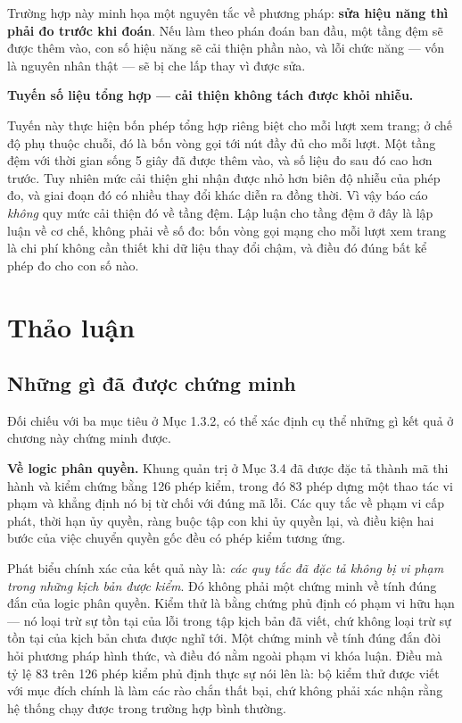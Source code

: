 Trường hợp này minh họa một nguyên tắc về phương pháp: \textbf{sửa hiệu năng thì phải đo trước khi đoán}. Nếu làm theo phán đoán ban đầu, một tầng đệm sẽ được thêm vào, con số hiệu năng sẽ cải thiện phần nào, và lỗi chức năng --- vốn là nguyên nhân thật --- sẽ bị che lấp thay vì được sửa.

\noindent \textbf{Tuyến số liệu tổng hợp --- cải thiện không tách được khỏi nhiễu.}

Tuyến này thực hiện bốn phép tổng hợp riêng biệt cho mỗi lượt xem trang; ở chế độ phụ thuộc chuỗi, đó là bốn vòng gọi tới nút đầy đủ cho mỗi lượt. Một tầng đệm với thời gian sống 5 giây đã được thêm vào, và số liệu đo sau đó cao hơn trước. Tuy nhiên mức cải thiện ghi nhận được nhỏ hơn biên độ nhiễu của phép đo, và giai đoạn đó có nhiều thay đổi khác diễn ra đồng thời. Vì vậy báo cáo \emph{không} quy mức cải thiện đó về tầng đệm. Lập luận cho tầng đệm ở đây là lập luận về cơ chế, không phải về số đo: bốn vòng gọi mạng cho mỗi lượt xem trang là chi phí không cần thiết khi dữ liệu thay đổi chậm, và điều đó đúng bất kể phép đo cho con số nào.
\section{Thảo luận}

\subsection{Những gì đã được chứng minh}

Đối chiếu với ba mục tiêu ở Mục 1.3.2, có thể xác định cụ thể những gì kết quả ở chương này chứng minh được.

\textbf{Về logic phân quyền.} Khung quản trị ở Mục 3.4 đã được đặc tả thành mã thi hành và kiểm chứng bằng 126 phép kiểm, trong đó 83 phép dựng một thao tác vi phạm và khẳng định nó bị từ chối với đúng mã lỗi. Các quy tắc về phạm vi cấp phát, thời hạn ủy quyền, ràng buộc tập con khi ủy quyền lại, và điều kiện hai bước của việc chuyển quyền gốc đều có phép kiểm tương ứng.

Phát biểu chính xác của kết quả này là: \emph{các quy tắc đã đặc tả không bị vi phạm trong những kịch bản được kiểm}. Đó không phải một chứng minh về tính đúng đắn của logic phân quyền. Kiểm thử là bằng chứng phủ định có phạm vi hữu hạn --- nó loại trừ sự tồn tại của lỗi trong tập kịch bản đã viết, chứ không loại trừ sự tồn tại của kịch bản chưa được nghĩ tới. Một chứng minh về tính đúng đắn đòi hỏi phương pháp hình thức, và điều đó nằm ngoài phạm vi khóa luận. Điều mà tỷ lệ 83 trên 126 phép kiểm phủ định thực sự nói lên là: bộ kiểm thử được viết với mục đích chính là làm các rào chắn thất bại, chứ không phải xác nhận rằng hệ thống chạy được trong trường hợp bình thường.

